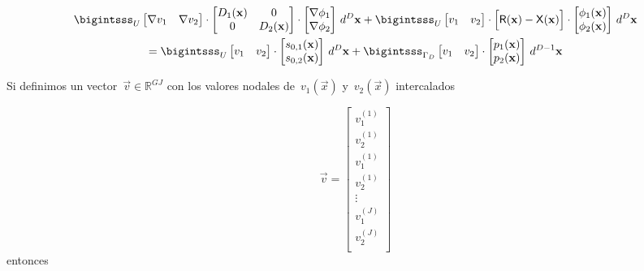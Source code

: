 \documentclass[
  12pt,
  a4paper,
  table]{scrbook}
\theoremstyle{plain}
\theoremstyle{definition}
\theoremstyle{plain}
\theoremstyle{plain}
\theoremstyle{remark}
\begin{document}
\[
\begin{gathered}
\bigintsss_U
\begin{bmatrix}
 \nabla v_1 & \nabla v_2
\end{bmatrix}
\cdot
\begin{bmatrix}
D_1(\vec{x}) & 0 \\
0 & D_2(\vec{x}) \\
\end{bmatrix}
\cdot
\begin{bmatrix}
\nabla \phi_1  \\
\nabla \phi_2  \\
\end{bmatrix}
\, d^D\vec{x}
+
\bigintsss_U
\begin{bmatrix}
 v_1 & v_2
\end{bmatrix}
\cdot
\Big[\mat{R}(\vec{x}) - \mat{X}(\vec{x})\Big]
\cdot
\begin{bmatrix}
 \phi_1(\vec{x}) \\
 \phi_2(\vec{x}) \\
\end{bmatrix}
\, d^D\vec{x}
\\
=
\bigintsss_U
\begin{bmatrix}
 v_1 & v_2
\end{bmatrix}
\cdot
\begin{bmatrix}
 s_{0,1}(\vec{x}) \\
 s_{0,2}(\vec{x}) \\
\end{bmatrix}
\, d^D\vec{x}
+
\bigintsss_{\Gamma_D}
\begin{bmatrix}
 v_1 & v_2
\end{bmatrix}
\cdot
\begin{bmatrix}
 p_1(\vec{x}) \\
 p_2(\vec{x}) \\
\end{bmatrix}
\, d^{D-1}\vec{x}
\end{gathered}
\]

Si definimos un vector~\(\vec{v} \in \mathbb{R}^{GJ}\) con los valores
nodales de~\(v_1(\vec{x})\) y~\(v_2(\vec{x})\) intercalados

\[
\vec{v} =
\begin{bmatrix}
 v_1^{(1)} \\ v_2^{(1)} \\
 v_1^{(1)} \\ v_2^{(1)} \\
\vdots \\
 v_1^{(J)} \\ v_2^{(J)} \\
\end{bmatrix}
\] entonces
\end{document}
